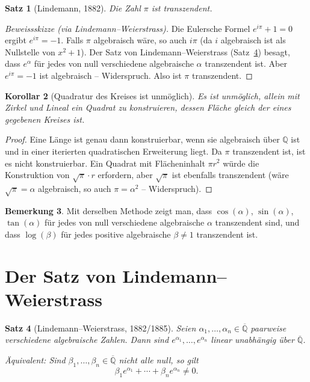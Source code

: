 \documentclass[12pt,a4paper]{amsart}
\newtheorem{theorem}{Satz}[section]
\newtheorem{korollar}[theorem]{Korollar}
\theoremstyle{definition}
\newtheorem{bemerkung}[theorem]{Bemerkung}
\begin{document}
\begin{theorem}[Lindemann, 1882]
\label{satz:pi-transz}
Die Zahl $\pi$ ist transzendent.
\end{theorem}

\begin{proof}[Beweissskizze (via Lindemann--Weierstrass)]
Die Eulersche Formel $e^{i\pi} + 1 = 0$ ergibt $e^{i\pi} = -1$.
Falls $\pi$ algebraisch wäre, so auch $i\pi$ (da $i$ algebraisch ist als
Nullstelle von $x^2 + 1$). Der Satz von Lindemann--Weierstrass
(Satz~\ref{satz:lw}) besagt, dass $e^\alpha$ für jedes von null verschiedene
algebraische $\alpha$ transzendent ist. Aber $e^{i\pi} = -1$ ist algebraisch
-- Widerspruch. Also ist $\pi$ transzendent.
\end{proof}

\begin{korollar}[Quadratur des Kreises ist unmöglich]
Es ist unmöglich, allein mit Zirkel und Lineal ein Quadrat zu konstruieren,
dessen Fläche gleich der eines gegebenen Kreises ist.
\end{korollar}
\begin{proof}
Eine Länge ist genau dann konstruierbar, wenn sie algebraisch über $\mathbb{Q}$
ist und in einer iterierten quadratischen Erweiterung liegt. Da $\pi$ transzendent
ist, ist es nicht konstruierbar. Ein Quadrat mit Flächeninhalt $\pi r^2$ würde
die Konstruktion von $\sqrt{\pi} \cdot r$ erfordern, aber $\sqrt{\pi}$ ist
ebenfalls transzendent (wäre $\sqrt{\pi} = \alpha$ algebraisch, so auch
$\pi = \alpha^2$ -- Widerspruch).
\end{proof}

\begin{bemerkung}
Mit derselben Methode zeigt man, dass $\cos(\alpha)$, $\sin(\alpha)$,
$\tan(\alpha)$ für jedes von null verschiedene algebraische $\alpha$ transzendent
sind, und dass $\log(\beta)$ für jedes positive algebraische $\beta \neq 1$
transzendent ist.
\end{bemerkung}


\section{Der Satz von Lindemann--Weierstrass}
\label{sec:lw}

\begin{theorem}[Lindemann--Weierstrass, 1882/1885]
\label{satz:lw}
Seien $\alpha_1, \ldots, \alpha_n \in \overline{\mathbb{Q}}$ paarweise
verschiedene algebraische Zahlen. Dann sind $e^{\alpha_1}, \ldots, e^{\alpha_n}$
linear unabhängig über $\overline{\mathbb{Q}}$.

Äquivalent: Sind $\beta_1, \ldots, \beta_n \in \overline{\mathbb{Q}}$ nicht alle
null, so gilt
\[
  \beta_1 e^{\alpha_1} + \cdots + \beta_n e^{\alpha_n} \neq 0.
\]
\end{theorem}
\end{document}
